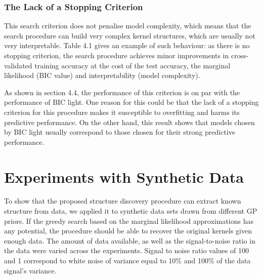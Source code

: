 \documentclass[a4paper,12pt ]{report}
\begin{document}
\subsubsection*{The Lack of a Stopping Criterion}

This search criterion does not penalise model complexity, which means that the search procedure can build very complex kernel structures, which are usually not very interpretable. Table 4.1 gives an example of such behaviour: as there is no stopping criterion, the search procedure achieves minor improvements in cross-validated training accuracy at the cost of the test accuracy, the marginal likelihood (BIC value) and interpretability (model complexity).

As shown in section 4.4, the performance of this criterion is on par with the performance of BIC light. One reason for this could be that the lack of a stopping criterion for this procedure makes it susceptible to overfitting and harms its predictive performance. On the other hand, this result shows that models chosen by BIC light usually correspond to those chosen for their strong predictive performance.  %





\section{Experiments with Synthetic Data}

To show that the proposed structure discovery procedure can extract known structure from data, we applied it to synthetic data sets drawn from different GP priors. If the greedy search based on the marginal likelihood approximations has any potential, the procedure should be able to recover the original kernels given enough data. The amount of data available, as well as the signal-to-noise ratio in the data were varied across the experiments. Signal to noise ratio values of 100 and 1 correspond to white noise of variance equal to 10\% and 100\% of the data signal's variance.
\end{document}
